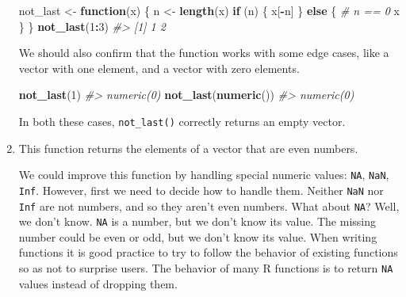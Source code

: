 \documentclass[]{book}
\newenvironment{Shaded}{\begin{snugshade}}{\end{snugshade}}
\newcommand{\CommentTok}[1]{\textcolor[rgb]{0.56,0.35,0.01}{\textit{#1}}}
\newcommand{\ControlFlowTok}[1]{\textcolor[rgb]{0.13,0.29,0.53}{\textbf{#1}}}
\newcommand{\DecValTok}[1]{\textcolor[rgb]{0.00,0.00,0.81}{#1}}
\newcommand{\KeywordTok}[1]{\textcolor[rgb]{0.13,0.29,0.53}{\textbf{#1}}}
\newcommand{\NormalTok}[1]{#1}
\newcommand{\OperatorTok}[1]{\textcolor[rgb]{0.81,0.36,0.00}{\textbf{#1}}}
\newcommand{\StringTok}[1]{\textcolor[rgb]{0.31,0.60,0.02}{#1}}
\theoremstyle{plain}
\theoremstyle{remark}
\begin{document}
\begin{enumerate}
\begin{Shaded}
\begin{Highlighting}[]
\NormalTok{not_last <-}\StringTok{ }\ControlFlowTok{function}\NormalTok{(x) \{}
\NormalTok{  n <-}\StringTok{ }\KeywordTok{length}\NormalTok{(x)}
  \ControlFlowTok{if}\NormalTok{ (n) \{}
\NormalTok{    x[}\OperatorTok{-}\NormalTok{n]}
\NormalTok{  \} }\ControlFlowTok{else}\NormalTok{ \{}
    \CommentTok{# n == 0}
\NormalTok{    x}
\NormalTok{  \}}
\NormalTok{\}}
\KeywordTok{not_last}\NormalTok{(}\DecValTok{1}\OperatorTok{:}\DecValTok{3}\NormalTok{)}
\CommentTok{#> [1] 1 2}
\end{Highlighting}
\end{Shaded}

  We should also confirm that the function works with some edge cases, like
  a vector with one element, and a vector with zero elements.

\begin{Shaded}
\begin{Highlighting}[]
\KeywordTok{not_last}\NormalTok{(}\DecValTok{1}\NormalTok{)}
\CommentTok{#> numeric(0)}
\KeywordTok{not_last}\NormalTok{(}\KeywordTok{numeric}\NormalTok{())}
\CommentTok{#> numeric(0)}
\end{Highlighting}
\end{Shaded}

  In both these cases, \texttt{not\_last()} correctly returns an empty vector.
\item
  This function returns the elements of a vector that are even numbers.

\begin{Shaded}
\end{Shaded}

  We could improve this function by handling special numeric values:
  \texttt{NA}, \texttt{NaN}, \texttt{Inf}. However, first we need to decide how to handle them.
  Neither \texttt{NaN} nor \texttt{Inf} are not numbers, and so they aren't even numbers.
  What about \texttt{NA}? Well, we don't know. \texttt{NA} is a number, but we don't know its
  value. The missing number could be even or odd, but we don't know its value.
  When writing functions it is good practice to try to follow the behavior
  of existing functions so as not to surprise users. The behavior of many
  R functions is to return \texttt{NA} values instead of dropping them.


\end{enumerate}
\end{document}
